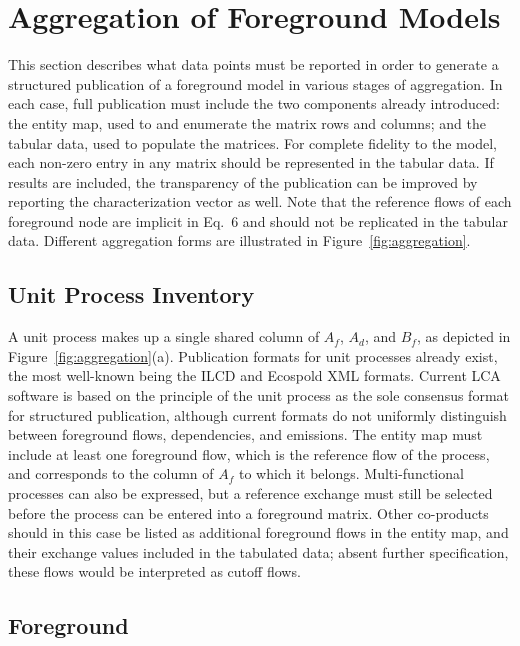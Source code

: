 \section{Aggregation of Foreground Models}



This section describes what data points must be reported in order to generate a structured publication of a foreground model in various stages of aggregation.  In each case, full publication must include the two components already introduced: the entity map, used to and enumerate the matrix rows and columns; and the tabular data, used to populate the matrices.  For complete fidelity to the model, each non-zero entry in any matrix should be represented in the tabular data.   If results are included, the transparency of the publication can be improved by reporting the characterization vector as well.  Note that the reference flows of each foreground node are implicit in Eq.~6 and should not be replicated in the tabular data. Different aggregation forms are illustrated in Figure~\ref{fig:aggregation}.

\subsection{Unit Process Inventory}

A unit process makes up a single shared column of $A_f$, $A_d$, and $B_f$, as depicted in Figure~\ref{fig:aggregation}(a).  Publication formats for unit processes already exist, the most well-known being the ILCD and Ecospold XML formats.  Current LCA software is based on the principle of the unit process as the sole consensus format for structured publication, although current formats do not uniformly distinguish between foreground flows, dependencies, and emissions.  The entity map must include at least one foreground flow, which is the reference flow of the process, and corresponds to the column of $A_f$ to which it belongs.  Multi-functional processes can also be expressed, but a reference exchange must still be selected before the process can be entered into a foreground matrix.  Other co-products should in this case be listed as additional foreground flows in the entity map, and their exchange values included in the tabulated data; absent further specification, these flows would be interpreted as cutoff flows.

\subsection{Foreground}

